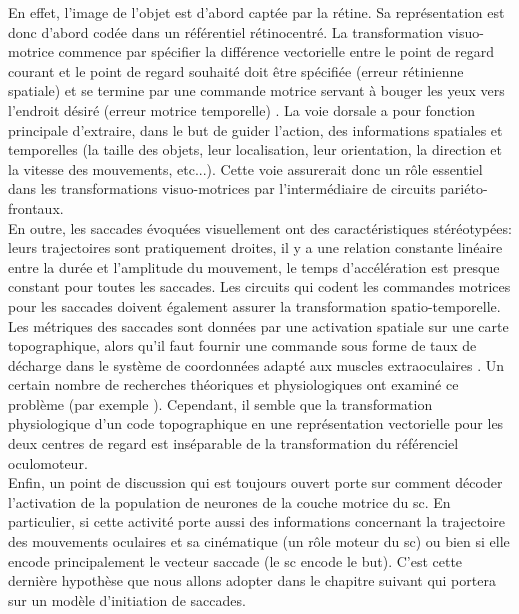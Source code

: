 En effet, l'image de l'objet est d'abord captée par la rétine. Sa représentation est donc d'abord codée dans un référentiel rétinocentré. La transformation visuo-motrice commence par spécifier la différence vectorielle entre le point de regard courant et le point de regard souhaité doit être spécifiée (erreur rétinienne spatiale) et se termine par une commande motrice servant à bouger les yeux vers l'endroit désiré (erreur motrice temporelle) \cite{Robinson:1968,Tweed:1990, Crawford:1997}. La voie dorsale a pour fonction principale d'extraire, dans le but de guider l'action, des informations spatiales et temporelles (la taille des objets, leur localisation, leur orientation, la direction et la vitesse des mouvements, etc...). Cette voie assurerait donc un rôle essentiel dans les transformations visuo-motrices par l'intermédiaire de circuits pariéto-frontaux.\\



En outre, les saccades évoquées visuellement ont des caractéristiques stéréotypées: leurs trajectoires sont pratiquement droites, il y a une relation constante linéaire entre la durée et l'amplitude du mouvement, le temps d'accélération est presque constant pour toutes les saccades. Les circuits qui codent les commandes motrices pour les saccades doivent également assurer la transformation spatio-temporelle. Les métriques des saccades sont données par une activation spatiale sur une carte topographique, alors qu'il faut fournir une commande sous forme de taux de décharge dans le système de coordonnées adapté aux muscles extraoculaires \cite{Becker:1973, Westheimer:1973}. Un certain nombre de recherches théoriques et physiologiques ont examiné ce problème (par exemple \cite{Hepp:1983, Optican:2002,Tweed:1990}). Cependant, il semble que la transformation physiologique d'un code topographique en une représentation vectorielle pour les deux centres de regard est inséparable de la transformation du référenciel oculomoteur. \\

Enfin, un point de discussion qui est toujours ouvert porte sur comment décoder l'activation de la population de neurones de la couche motrice du \gls{sc}. En particulier, si cette activité porte aussi des informations concernant la trajectoire des mouvements oculaires et sa cinématique (un rôle moteur du \gls{sc}) ou bien si elle encode principalement le vecteur saccade (le \gls{sc} encode le but). C'est cette dernière hypothèse que nous allons adopter dans le chapitre suivant qui portera sur un modèle d'initiation de saccades. \\

